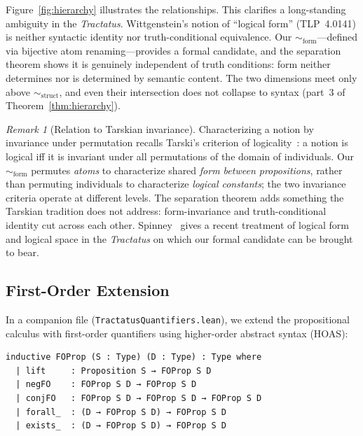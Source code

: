 \documentclass[10pt, letterpaper]{article}
\theoremstyle{definition}
\theoremstyle{remark}
\newtheorem{remark}[theorem]{Remark}
\newcommand{\structEq}{\sim_{\mathrm{struct}}}
\newcommand{\formEq}{\sim_{\mathrm{form}}}
\begin{document}
\noindent
Figure~\ref{fig:hierarchy} illustrates the relationships.  This
clarifies a long-standing ambiguity in the
\emph{Tractatus}.  Wittgenstein's notion of ``logical form''
(TLP~4.0141) is neither syntactic identity nor truth-conditional
equivalence.  Our $\formEq$---defined via bijective atom
renaming---provides a formal candidate, and the separation
theorem shows it is genuinely independent of truth conditions:
form neither determines nor is determined by semantic content.
The two dimensions meet only above $\structEq$, and even their
intersection does not collapse to syntax
(part~3 of Theorem~\ref{thm:hierarchy}).

\begin{remark}[Relation to Tarskian invariance]
\label{rem:tarski}
Characterizing a notion by invariance under permutation recalls
Tarski's criterion of logicality~\cite{tarski1986}: a notion is
logical iff it is invariant under all permutations of the domain
of individuals.  Our $\formEq$ permutes \emph{atoms} to
characterize shared \emph{form between propositions}, rather
than permuting individuals to characterize \emph{logical
constants}; the two invariance criteria operate at different
levels.  The separation theorem adds something the Tarskian
tradition does not address: form-invariance and
truth-conditional identity cut across each other.
Spinney~\cite{spinney2022} gives a recent treatment of logical
form and logical space in the \emph{Tractatus} on which our
formal candidate can be brought to bear.
\end{remark}

\subsection{First-Order Extension}
\label{sec:firstorder}

In a companion file (\texttt{TractatusQuantifiers.lean}), we
extend the propositional calculus with first-order quantifiers
using higher-order abstract syntax (HOAS):

\begin{lstlisting}
inductive FOProp (S : Type) (D : Type) : Type where
  | lift     : Proposition S → FOProp S D
  | negFO    : FOProp S D → FOProp S D
  | conjFO   : FOProp S D → FOProp S D → FOProp S D
  | forall_  : (D → FOProp S D) → FOProp S D
  | exists_  : (D → FOProp S D) → FOProp S D
\end{lstlisting}
\end{document}
